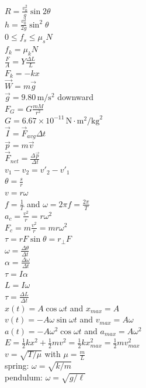 \documentclass[letterpaper,addpoints,answers]{exam}
\begin{document}
\begin{multicols}{2}
 \noindent
 $R = \frac{v_0^2}{g}\sin 2\theta$ \\
 $h = \frac{v_0^2}{2 g} \sin^2 \theta$ \\
 $0 \le f_s \le \mu_s N$ \\
 $f_k = \mu_k N$ \\
 $\frac{F}{A} = Y \frac{\Delta L}{L}$ \\
 $F_k = -k x$ \\
 $\vec{W} = m \vec{g}$ \\
 $\vec{g} = 9.80\,\mbox{m}/\mbox{s}^2$ downward \\
 $F_G = G \frac{m M}{r^2}$ \\
 $G = 6.67 \times 10^{-11}\,\mbox{N}\cdot\mbox{m}^2/\mbox{kg}^2$ \\
 $\vec{I} = \vec{F}_{avg} \Delta t$ \\
 $\vec{p} = m \vec{v}$ \\
 $\vec{F}_{net} = \frac{\Delta \vec{p}}{\Delta t}$ \\
 $v_1 - v_2 = v'_2 - v'_1$ \\
 $\theta = \frac{s}{r}$ \\
 $v = r \omega$ \\
 $f = \frac{1}{T}$ and $\omega = 2 \pi f = \frac{2 \pi}{T}$ \\
 $a_c = \frac{v^2}{r} = r \omega^2$ \\
 $F_c = m\frac{v^2}{r} = m r \omega^2$ \\
 $\tau = r F \sin\theta = r_\perp F$ \\
 $\omega = \frac{\Delta \theta}{\Delta t}$ \\
 $\alpha = \frac{\Delta \omega}{\Delta t}$ \\
 $\tau = I \alpha$ \\
 $L = I \omega$ \\
 $\tau = \frac{\Delta L}{\Delta t}$ \\
 $x(t) = A \cos \omega t$ and $x_{max} = A$ \\
 $v(t) = - A \omega \sin \omega t$ and $v_{max} = A \omega$ \\
 $a(t) = - A \omega^2 \cos \omega t$ and $a_{max} = A \omega^2$ \\
 $E = \frac{1}{2} k x^2 + \frac{1}{2} m v^2 = \frac{1}{2} k x_{max}^2 = \frac{1}{2} m v_{max}^2$ \\
 $v = \sqrt{T/\mu}$ with $\mu = \frac{m}{L}$ \\
 spring: $\omega = \sqrt{k/m}$ \\
 pendulum: $\omega = \sqrt{g/\ell}$ \\

\end{multicols}
\end{document}
